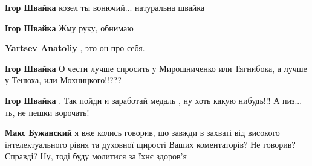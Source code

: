 \begin{itemize}
\begin{itemize}
\textbf{Ігор Швайка} козел ты вонючий... натуральна швайка

 
\textbf{Ігор Швайка} Жму руку, обнимаю

 
\textbf{Yartsev Anatoliy} , это он про себя. 🤣

 
\textbf{Ігор Швайка} О чести лучше спросить у Мирошниченко или Тягнибока, а лучше у Тенюха, или Мохницкого!!???

 
\textbf{Ігор Швайка} . Так пойди и заработай медаль , ну хоть какую нибудь!!! А пиз... ть, не пешки ворочать!

 

\textbf{Макс Бужанский} я вже колись говорив, що завжди в захваті від високого
інтелектуального рівня та духовної щирості Ваших коментаторів?  Не говорив?
Справді?  Ну, тоді буду молитися за їхнє здоров’я 🙏🙏🙏

 

\end{itemize}
\end{itemize}
